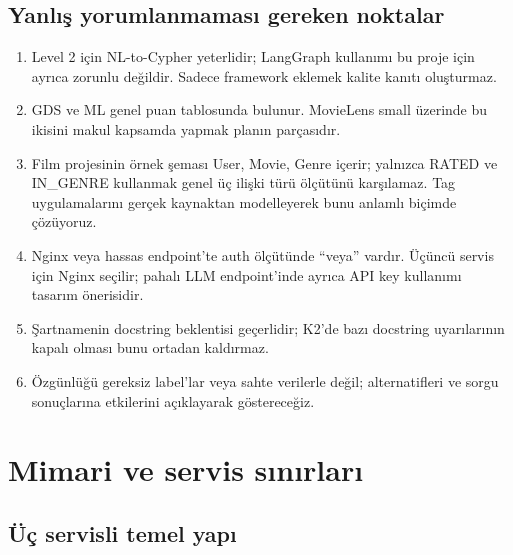 \documentclass[11pt,a4paper]{article}
\begin{document}
\subsection{Yanlış yorumlanmaması gereken noktalar}
\begin{enumerate}
\item Level 2 için NL-to-Cypher yeterlidir; LangGraph kullanımı bu proje için ayrıca zorunlu değildir. Sadece framework eklemek kalite kanıtı oluşturmaz.
\item GDS ve ML genel puan tablosunda bulunur. MovieLens small üzerinde bu ikisini makul kapsamda yapmak planın parçasıdır.
\item Film projesinin örnek şeması User, Movie, Genre içerir; yalnızca RATED ve IN\_GENRE kullanmak genel üç ilişki türü ölçütünü karşılamaz. Tag uygulamalarını gerçek kaynaktan modelleyerek bunu anlamlı biçimde çözüyoruz.
\item Nginx veya hassas endpoint'te auth ölçütünde ``veya'' vardır. Üçüncü servis için Nginx seçilir; pahalı LLM endpoint'inde ayrıca API key kullanımı tasarım önerisidir.
\item Şartnamenin docstring beklentisi geçerlidir; K2'de bazı docstring uyarılarının kapalı olması bunu ortadan kaldırmaz.
\item Özgünlüğü gereksiz label'lar veya sahte verilerle değil; alternatifleri ve sorgu sonuçlarına etkilerini açıklayarak göstereceğiz.
\end{enumerate}

\section{Mimari ve servis sınırları}
\subsection{Üç servisli temel yapı}
\begin{center}
\end{center}
\end{document}
